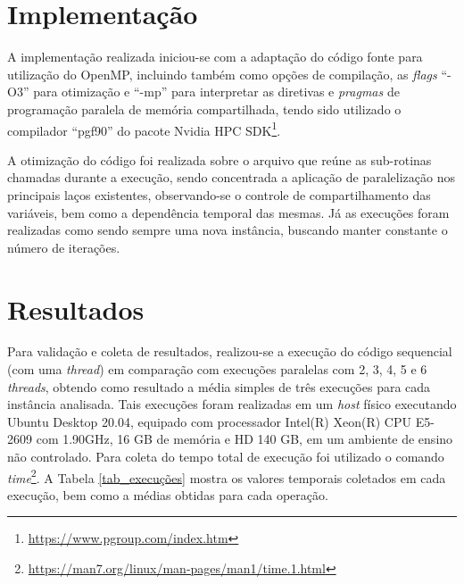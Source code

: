 \documentclass[12pt]{article}
\begin{document}
\section{Implementação} \label{sec:implementacao}
A implementação realizada iniciou-se com a adaptação do código fonte para utilização do OpenMP, incluindo também como opções de compilação, as \textit{flags} ``-O3'' para otimização e ``-mp'' para interpretar as diretivas e \textit{pragmas} de programação paralela de memória compartilhada, tendo sido utilizado o compilador ``pgf90'' do pacote Nvidia HPC SDK\footnote{\url{https://www.pgroup.com/index.htm}}.

A otimização do código foi realizada sobre o arquivo que reúne as sub-rotinas chamadas durante a execução, sendo concentrada a aplicação de paralelização nos principais laços existentes, observando-se o controle de compartilhamento das variáveis, bem como a dependência temporal das mesmas. Já as execuções foram realizadas como sendo sempre uma nova instância, buscando manter constante o número de iterações.

\section{Resultados} \label{sec:resultados}

Para validação e coleta de resultados, realizou-se a execução do código sequencial (com uma \textit{thread}) em comparação com execuções paralelas com 2, 3, 4, 5 e 6 \textit{threads}, obtendo como resultado a média simples de três execuções para cada instância analisada. Tais execuções foram realizadas em um \textit{host} físico executando Ubuntu Desktop 20.04, equipado com processador Intel(R) Xeon(R) CPU E5-2609 com 1.90GHz, 16 GB de memória e HD 140 GB, em um ambiente de ensino não controlado. Para coleta do tempo total de execução foi utilizado o comando \textit{time}\footnote{\url{https://man7.org/linux/man-pages/man1/time.1.html}}. A Tabela \ref{tab_execuções} mostra os valores temporais coletados em cada execução, bem como a médias obtidas para cada operação.
\end{document}
